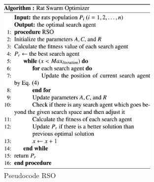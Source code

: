 \begin{figure}[ht]
    \begin{center}
        \includegraphics[width=0.7\textwidth]{assets/img/12652_2020_2580_Figa_HTML.png}
        \caption[Pseudocode RSO]{Pseudocode RSO \cite{dhiman_garg_nagar_kumar_dehghani_2020}}
        \label{rso_pseudocode}
    \end{center}
\end{figure}